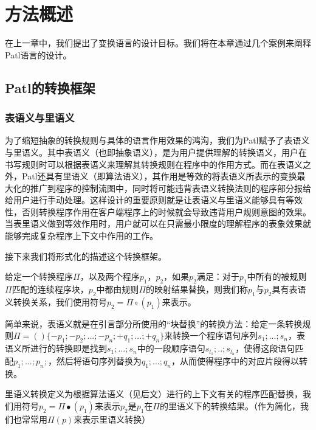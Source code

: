 
\chapter{方法概述}
在上一章中，我们提出了变换语言的设计目标。我们将在本章通过几个案例来阐释Patl语言的设计。

\section{Patl的转换框架}

\subsection{表语义与里语义}

为了缩短抽象的转换规则与具体的语言作用效果的鸿沟，我们为Patl赋予了表语义与里语义。其中表语义（也即抽象语义），是为用户提供理解的转换语义，用户在书写规则时可以根据表语义来理解其转换规则在程序中的作用方式。而在表语义之外，Patl还具有里语义（即算法语义），其作用是等效的将表语义所表示的变换最大化的推广到程序的控制流图中，同时将可能违背表语义转换法则的程序部分报给给用户进行手动处理。这样设计的重要原则就是让表语义与里语义能够具有等效性，否则转换程序作用在客户端程序上的时候就会导致违背用户规则意图的效果。当表里语义做到等效作用时，用户就可以在只需最小限度的理解程序的表象效果就能够完成复杂程序上下文中作用的工作。

接下来我们将形式化的描述这个转换框架。
\begin{definition}[表语义转换]
给定一个转换程序$\Pi$，以及两个程序$p_1$，$p_2$，如果$p_2$满足：对于$p_1$中所有的被规则$\Pi$匹配的连续程序块，$p_2$中都由规则$\Pi$的映射结果替换，则我们称$p_1$与$p_2$具有表语义转换关系，我们使用符号$p_2={\Pi}\circ(p_1)$来表示。
\end{definition}

简单来说，表语义就是在引言部分所使用的“块替换”的转换方法：给定一条转换规则$\Pi=()\{-p_1;-p_2;...;-p_n;+q_1;...;+q_n\}$来转换一个程序语句序列$s_1;...;s_n$，表语义所进行的转换即是找到$s_1;...;s_n$中的一段顺序语句$s_{l_1};..;s_{l_u}$，使得这段语句匹配$p_1;...;p_n;$，然后将语句序列替换为$q_1;...;q_n$，从而使得程序中的对应片段得以转换。

\begin{definition}[里语义转换]
里语义转换定义为根据算法语义（见后文）进行的上下文有关的程序匹配替换，我们用符号$p_2=\Pi\bullet(p_1)$来表示$p_2$是$p_1$在$\Pi$的里语义下的转换结果。（作为简化，我们也常常用$\Pi(p)$来表示里语义转换）
\end{definition}

